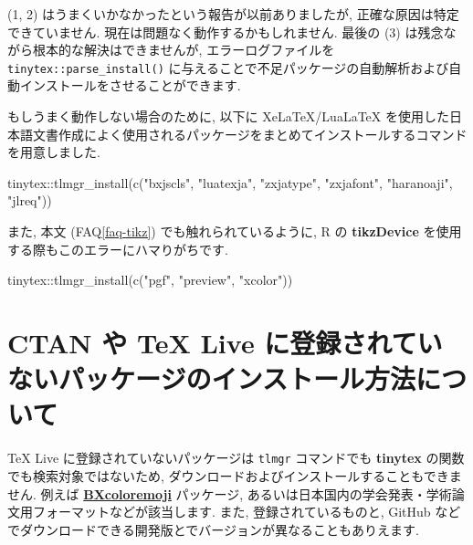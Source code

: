 \documentclass[
  xelatex,ja=standard,jafont=noto]{bxjsreport}
\newenvironment{Shaded}{\begin{snugshade}}{\end{snugshade}}
\newcommand{\FunctionTok}[1]{\textcolor[rgb]{0.00,0.00,0.00}{#1}}
\newcommand{\NormalTok}[1]{#1}
\newcommand{\SpecialCharTok}[1]{\textcolor[rgb]{0.00,0.00,0.00}{#1}}
\newcommand{\StringTok}[1]{\textcolor[rgb]{0.31,0.60,0.02}{#1}}
\begin{document}
(1, 2) はうまくいかなかったという報告が以前ありましたが,
正確な原因は特定できていません. 現在は問題なく動作するかもしれません.
最後の (3) は残念ながら根本的な解決はできませんが, エラーログファイルを
\texttt{tinytex::parse\_install()}
に与えることで不足パッケージの自動解析および自動インストールをさせることができます.

もしうまく動作しない場合のために, 以下に XeLaTeX/LuaLaTeX
を使用した日本語文書作成によく使用されるパッケージをまとめてインストールするコマンドを用意しました.

\begin{Shaded}
\begin{Highlighting}[numbers=left,,]
\NormalTok{tinytex}\SpecialCharTok{::}\FunctionTok{tlmgr\_install}\NormalTok{(}\FunctionTok{c}\NormalTok{(}\StringTok{"bxjscls"}\NormalTok{, }\StringTok{"luatexja"}\NormalTok{, }\StringTok{"zxjatype"}\NormalTok{, }\StringTok{"zxjafont"}\NormalTok{, }\StringTok{"haranoaji"}\NormalTok{, }\StringTok{"jlreq"}\NormalTok{))}
\end{Highlighting}
\end{Shaded}

また, 本文 (FAQ\ref{faq-tikz}) でも触れられているように, R の
\textbf{tikzDevice} を使用する際もこのエラーにハマりがちです.

\begin{Shaded}
\begin{Highlighting}[numbers=left,,]
\NormalTok{tinytex}\SpecialCharTok{::}\FunctionTok{tlmgr\_install}\NormalTok{(}\FunctionTok{c}\NormalTok{(}\StringTok{"pgf"}\NormalTok{, }\StringTok{"preview"}\NormalTok{, }\StringTok{"xcolor"}\NormalTok{))}
\end{Highlighting}
\end{Shaded}

\hypertarget{ctan-ux3084-tex-live-ux306bux767bux9332ux3055ux308cux3066ux3044ux306aux3044ux30d1ux30c3ux30b1ux30fcux30b8ux306eux30a4ux30f3ux30b9ux30c8ux30fcux30ebux65b9ux6cd5ux306bux3064ux3044ux3066}{%
\section{CTAN や TeX Live
に登録されていないパッケージのインストール方法について}\label{ctan-ux3084-tex-live-ux306bux767bux9332ux3055ux308cux3066ux3044ux306aux3044ux30d1ux30c3ux30b1ux30fcux30b8ux306eux30a4ux30f3ux30b9ux30c8ux30fcux30ebux65b9ux6cd5ux306bux3064ux3044ux3066}}

TeX Live に登録されていないパッケージは \texttt{tlmgr} コマンドでも
\textbf{tinytex} の関数でも検索対象ではないため,
ダウンロードおよびインストールすることもできません. 例えば
\href{https://github.com/zr-tex8r/BXcoloremoji}{\textbf{BXcoloremoji}}
パッケージ,
あるいは日本国内の学会発表・学術論文用フォーマットなどが該当します.
また, 登録されているものと, GitHub
などでダウンロードできる開発版とでバージョンが異なることもありえます.
\end{document}
